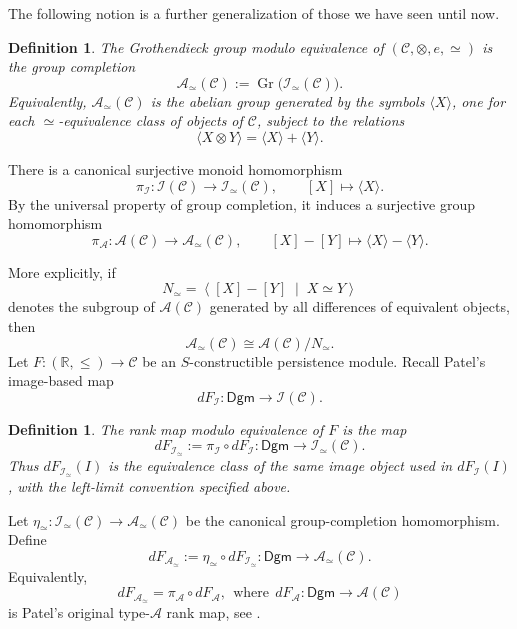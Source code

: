 \documentclass{amsart}
\newtheorem{definition}[theorem]{Definition}
\begin{document}
The following notion is a further generalization of those we have seen until now.

\begin{definition}
The \textit{Grothendieck group modulo equivalence} of
$(\mathcal{C},\otimes,e,\simeq)$ is the group completion
\[
\mathcal{A}_{\simeq}(\mathcal{C})
:=
\operatorname{Gr}
\bigl(\mathcal{I}_{\simeq}(\mathcal{C})\bigr).
\]
Equivalently, $\mathcal{A}_{\simeq}(\mathcal{C})$ is the abelian
group generated by the symbols $\langle X\rangle$, one for each
$\simeq$-equivalence class of objects of $\mathcal{C}$, subject to
the relations
\[
\langle X\otimes Y\rangle
=
\langle X\rangle+\langle Y\rangle.
\]
\end{definition}

There is a canonical surjective monoid homomorphism
\[
\pi_{\mathcal I}\colon
\mathcal{I}(\mathcal{C})
\longrightarrow
\mathcal{I}_{\simeq}(\mathcal{C}),
\qquad
[X]\longmapsto\langle X\rangle.
\]
By the universal property of group completion, it induces a
surjective group homomorphism
\[
\pi_{\mathcal A}\colon
\mathcal{A}(\mathcal{C})
\longrightarrow
\mathcal{A}_{\simeq}(\mathcal{C}),
\qquad
[X]-[Y]\longmapsto
\langle X\rangle-\langle Y\rangle.
\]

More explicitly, if
\[
N_{\simeq}
=
\left\langle
[X]-[Y]\;\middle|\;X\simeq Y
\right\rangle
\]
denotes the subgroup of $\mathcal{A}(\mathcal{C})$ generated by all
differences of equivalent objects, then
\[
\mathcal{A}_{\simeq}(\mathcal{C})
\cong
\mathcal{A}(\mathcal{C})/N_{\simeq}.
\]
Let $F\colon(\mathbb{R},\leq)\longrightarrow\mathcal{C}$
be an $S$-constructible persistence module. Recall Patel's
image-based map
\[
dF_{\mathcal I}\colon
\mathsf{Dgm}\longrightarrow\mathcal{I}(\mathcal{C}).
\]

\begin{definition}
The \textit{rank map modulo equivalence} of $F$ is the map
\[
dF_{\mathcal{I}_{\simeq}}
:=
\pi_{\mathcal I}\circ dF_{\mathcal I}
\colon
\mathsf{Dgm}
\longrightarrow
\mathcal{I}_{\simeq}(\mathcal{C}).
\]
Thus $dF_{\mathcal I_{\simeq}}(I)$ is the equivalence class of the same image object used in $dF_{\mathcal I}(I)$, with the left-limit convention specified above.
\end{definition}

Let $\eta_{\simeq}\colon
\mathcal{I}_{\simeq}(\mathcal{C})
\longrightarrow
\mathcal{A}_{\simeq}(\mathcal{C})$
be the canonical group-completion homomorphism. Define
\[
dF_{\mathcal{A}_{\simeq}}
:=
\eta_{\simeq}\circ
dF_{\mathcal{I}_{\simeq}}
\colon
\mathsf{Dgm}
\longrightarrow
\mathcal{A}_{\simeq}(\mathcal{C}).
\]
Equivalently,
\[
dF_{\mathcal{A}_{\simeq}}
=
\pi_{\mathcal A}\circ dF_{\mathcal A}, \ \ 
\mbox{where} \ \ 
dF_{\mathcal A}\colon
\mathsf{Dgm}\longrightarrow\mathcal{A}(\mathcal{C})
\]
is Patel's original type-$\mathcal A$ rank map, see \cite{patel2016generalized}.
\end{document}
